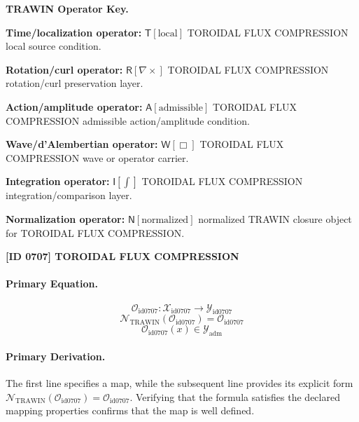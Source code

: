 \par\vspace{0.45\baselineskip}
\noindent\begin{minipage}[t]{\linewidth}
\begingroup
\small
\raggedright
\textbf{TRAWIN Operator Key.}\par
\noindent\textbf{Time/localization operator:} $\mathsf{T}\!\left[\mathrm{local}\right]$ TOROIDAL FLUX COMPRESSION local source condition.\par
\noindent\textbf{Rotation/curl operator:} $\mathsf{R}\!\left[\nabla\times\right]$ TOROIDAL FLUX COMPRESSION rotation/curl preservation layer.\par
\noindent\textbf{Action/amplitude operator:} $\mathsf{A}\!\left[\mathrm{admissible}\right]$ TOROIDAL FLUX COMPRESSION admissible action/amplitude condition.\par
\noindent\textbf{Wave/d'Alembertian operator:} $\mathsf{W}\!\left[\Box\right]$ TOROIDAL FLUX COMPRESSION wave or operator carrier.\par
\noindent\textbf{Integration operator:} $\mathsf{I}\!\left[\int\right]$ TOROIDAL FLUX COMPRESSION integration/comparison layer.\par
\noindent\textbf{Normalization operator:} $\mathsf{N}\!\left[\mathrm{normalized}\right]$ normalized TRAWIN closure object for TOROIDAL FLUX COMPRESSION.\par
\endgroup
\end{minipage}

\clearpage
\noindent\textbf{[ID 0707] TOROIDAL FLUX COMPRESSION}\par
\vspace{0.35em}
\paragraph{Primary Equation.}
\[
\mathcal{O}_{\mathrm{id0707}}:\mathcal{X}_{\mathrm{id0707}}\longrightarrow\mathcal{Y}_{\mathrm{id0707}}
\]
\[
\mathcal{N}_{\mathrm{TRAWIN}}(\mathcal{O}_{\mathrm{id0707}})=\mathcal{O}_{\mathrm{id0707}}
\]
\[
\mathcal{O}_{\mathrm{id0707}}(x)\in\mathcal{Y}_{\mathrm{adm}}
\]

\paragraph{Primary Derivation.}
The first line specifies a map, while the subsequent line provides its explicit form \( \mathcal{N}_{\mathrm{TRAWIN}}(\mathcal{O}_{\mathrm{id0707}})=\mathcal{O}_{\mathrm{id0707}} \). Verifying that the formula satisfies the declared mapping properties confirms that the map is well defined.
